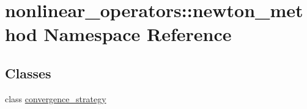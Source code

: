\hypertarget{namespacenonlinear__operators_1_1newton__method}{\section{nonlinear\-\_\-operators\-:\-:newton\-\_\-method Namespace Reference}
\label{namespacenonlinear__operators_1_1newton__method}
}
\subsection*{Classes}
\begin{DoxyCompactItemize}
\item 
class \hyperlink{classnonlinear__operators_1_1newton__method_1_1convergence__strategy}{convergence\-\_\-strategy}
\end{DoxyCompactItemize}
